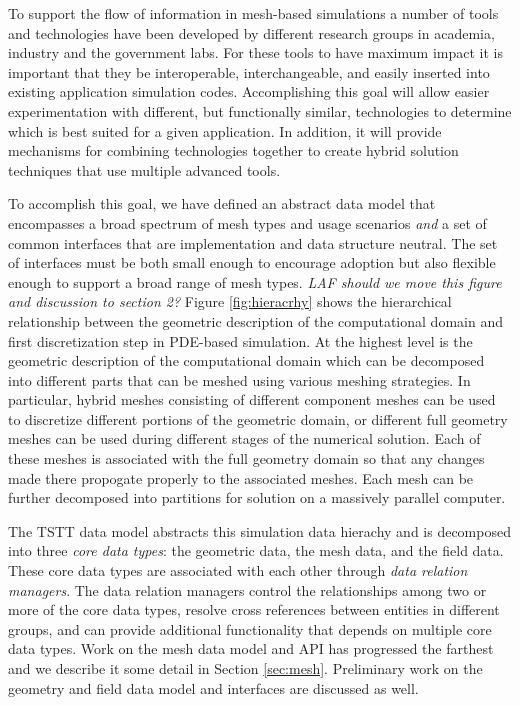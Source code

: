 To support the flow of information in mesh-based simulations a number
of tools and technologies have been developed by different research
groups in academia, industry and the government labs.  For these tools
to have maximum impact it is important that they be interoperable,
interchangeable, and easily inserted into existing application
simulation codes.  Accomplishing this goal will allow easier
experimentation with different, but functionally similar, technologies
to determine which is best suited for a given application.  In
addition, it will provide mechanisms for combining technologies
together to create hybrid solution techniques that use multiple
advanced tools.

To accomplish this goal, we have defined an abstract data model that
encompasses a broad spectrum of mesh types and usage scenarios {\it
and} a set of common interfaces that are implementation and data
structure neutral.  The set of interfaces must be both small enough to
encourage adoption but also flexible enough to support a broad range
of mesh types.  {\it LAF should we move this figure and discussion to
section 2?} Figure \ref{fig:hieracrhy} shows the hierarchical
relationship between the geometric description of the computational
domain and first discretization step in PDE-based simulation.  At the
highest level is the geometric description of the computational domain
which can be decomposed into different parts that can be meshed using
various meshing strategies.  In particular, hybrid meshes consisting
of different component meshes can be used to discretize different
portions of the geometric domain, or different full geometry meshes
can be used during different stages of the numerical solution.  Each
of these meshes is associated with the full geometry domain so that
any changes made there propogate properly to the associated meshes.
Each mesh can be further decomposed into partitions for solution on a
massively parallel computer.

The TSTT data model abstracts this simulation data hierachy and is
decomposed into three {\it core data types}: the geometric data, the
mesh data, and the field data.  These core data types are associated
with each other through {\it data relation managers}. The data
relation managers control the relationships among two or more of the
core data types, resolve cross references between entities in
different groups, and can provide additional functionality that
depends on multiple core data types.  Work on the mesh data model and
API has progressed the farthest and we describe it some detail in
Section \ref{sec:mesh}.  Preliminary work on the geometry and field
data model and interfaces are discussed as well.


